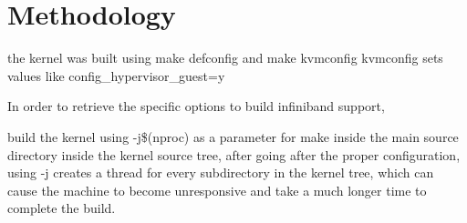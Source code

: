 \section{Methodology}




the kernel was built using make 
defconfig and make kvmconfig %
kvmconfig sets values like config\_hypervisor\_guest=y



In order to retrieve the specific options to build infiniband support,  


build the kernel using -j\$(nproc) as a parameter for make inside the main source directory
inside the kernel source tree, after going after the proper configuration, using -j creates a 
thread for every subdirectory in the kernel tree, which can cause the machine to become 
unresponsive and take a much longer time to complete the build. \cite{kroah-hartman06}